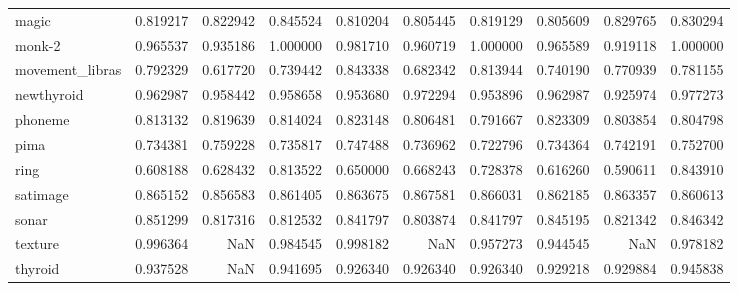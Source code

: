 \begin{tabular}{lrrrrrrrrr}
magic           &             0.819217 &             0.822942 &            0.845524 &              0.810204 &              0.805445 &             0.819129 &      0.805609 &      0.829765 &     0.830294 \\
monk-2          &             0.965537 &             0.935186 &            1.000000 &              0.981710 &              0.960719 &             1.000000 &      0.965589 &      0.919118 &     1.000000 \\
movement\_libras &             0.792329 &             0.617720 &            0.739442 &              0.843338 &              0.682342 &             0.813944 &      0.740190 &      0.770939 &     0.781155 \\
newthyroid      &             0.962987 &             0.958442 &            0.958658 &              0.953680 &              0.972294 &             0.953896 &      0.962987 &      0.925974 &     0.977273 \\
phoneme         &             0.813132 &             0.819639 &            0.814024 &              0.823148 &              0.806481 &             0.791667 &      0.823309 &      0.803854 &     0.804798 \\
pima            &             0.734381 &             0.759228 &            0.735817 &              0.747488 &              0.736962 &             0.722796 &      0.734364 &      0.742191 &     0.752700 \\
ring            &             0.608188 &             0.628432 &            0.813522 &              0.650000 &              0.668243 &             0.728378 &      0.616260 &      0.590611 &     0.843910 \\
satimage        &             0.865152 &             0.856583 &            0.861405 &              0.863675 &              0.867581 &             0.866031 &      0.862185 &      0.863357 &     0.860613 \\
sonar           &             0.851299 &             0.817316 &            0.812532 &              0.841797 &              0.803874 &             0.841797 &      0.845195 &      0.821342 &     0.846342 \\
texture         &             0.996364 &                  NaN &            0.984545 &              0.998182 &                   NaN &             0.957273 &      0.944545 &           NaN &     0.978182 \\
thyroid         &             0.937528 &                  NaN &            0.941695 &              0.926340 &              0.926340 &             0.926340 &      0.929218 &      0.929884 &     0.945838 \\

\end{tabular}
